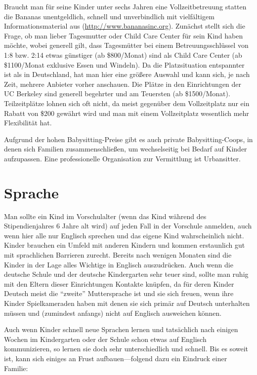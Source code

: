 \documentclass[a4paper]{scrreprt}
\begin{document}
Braucht man für seine Kinder unter sechs Jahren eine Vollzeitbetreuung statten die Bananas unentgeldlich,
schnell und unverbindlich mit vielfältigem Informationsmaterial aus (\url{http://www.bananasinc.org}).
Zunächst stellt sich die Frage, ob man lieber Tagesmutter oder Child Care Center für sein Kind haben möchte,
wobei generell gilt, dass Tagesmütter bei einem Betreuungsschlüssel von 1:8 bzw. 2:14 
etwas günstiger (ab \$800/Monat) sind als Child Care Center (ab \$1100/Monat exklusive Essen und Windeln).
Da die Platzsituation entspannter ist als in Deutschland, hat man hier eine größere Auswahl und kann sich, je nach Zeit,
mehrere Anbieter vorher anschauen.
Die Plätze in den Einrichtungen der UC Berkeley sind generell begehrter und am Teuersten (ab \$1500/Monat).
Teilzeitplätze lohnen sich oft nicht, da meist gegenüber dem Vollzeitplatz nur ein Rabatt von \$200 gewährt wird
und man mit einem Vollzeitplatz wesentlich mehr Flexibilität hat. 

Aufgrund der hohen Babysitting-Preise gibt es auch private Babysitting-Coops, in denen sich Familien zusammenschließen, um wechselseitig bei Bedarf auf Kinder aufzupassen.
Eine professionelle Organisation zur Vermittlung ist Urbansitter.

\section{Sprache}

Man sollte ein Kind im Vorschulalter (wenn das Kind während des Stipendienjahres 6 Jahre alt wird) auf jeden Fall in der Vorschule anmelden, auch wenn hier alle nur Englisch sprechen und das eigene Kind wahrscheinlich nicht. Kinder brauchen ein Umfeld mit anderen Kindern und kommen erstaunlich gut mit sprachlichen Barrieren zurecht. Bereits nach wenigen Monaten sind die Kinder in der Lage alles Wichtige in Englisch auszudrücken. Auch wenn die deutsche Schule und der deutsche Kindergarten sehr teuer sind, sollte man ruhig mit den Eltern dieser Einrichtungen Kontakte knüpfen, da für deren Kinder Deutsch meist die "`zweite"' Muttersprache ist und sie sich freuen, wenn ihre Kinder Spielkameraden haben mit denen sie sich primär auf Deutsch unterhalten müssen und (zumindest anfangs) nicht auf Englisch ausweichen können.

Auch wenn Kinder schnell neue Sprachen lernen und tatsächlich nach einigen Wochen im Kindergarten oder der Schule schon etwas auf Englisch kommunizieren, so lernen sie doch sehr unterschiedlich und schnell. Bis es soweit ist, kann sich einiges an Frust aufbauen---folgend dazu ein Eindruck einer Familie:
\end{document}
